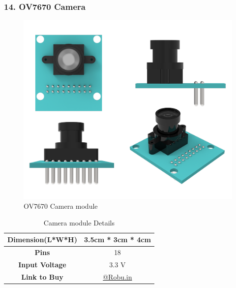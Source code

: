 \documentclass[12pt,a4paper,oneside]{book}
\begin{document}
			\subsubsection*{14. OV7670 Camera}
				\begin{figure}[H]
					\centering
					\includegraphics[scale=1]{CAM FULL}
					\caption{OV7670 Camera module}	 
				\end{figure}
				\begin{table}[H]
				\centering
				\def\arraystretch{1.5}
					\caption{Camera module Details}
					\vspace{0.5cm}
					\begin{tabular}{|c||c|}
					\hline
						\textbf{Dimension(L*W*H)} & 3.5cm * 3cm * 4cm\\\hline
						\textbf{Pins} & 18\\\hline
						\textbf{Input Voltage} & 3.3 V\\\hline
						\textbf{Link to Buy} & \href{https://robu.in/product/ov7670-640x480-vga-cmos-camera-image-sensor-module/}{@Robu.in}\\\hline
					\end{tabular}
				\end{table}
				\pagebreak
				
\end{document}
